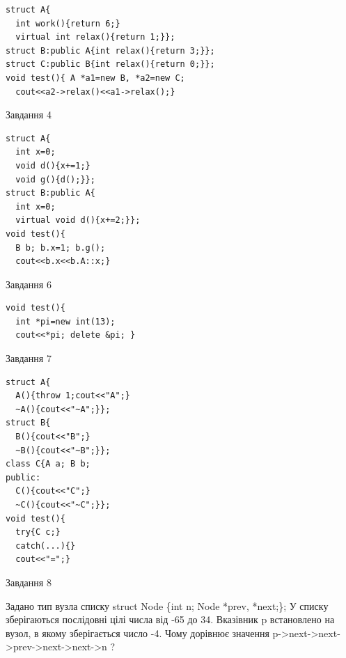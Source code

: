\documentclass[12pt, ukrainian]{article}
\begin{document}
{{{{{{\begin{minipage}[t]{11cm}
\begin{verbatim}
struct A{
  int work(){return 6;}
  virtual int relax(){return 1;}};
struct B:public A{int relax(){return 3;}};
struct C:public B{int relax(){return 0;}};
void test(){ A *a1=new B, *a2=new C;
  cout<<a2->relax()<<a1->relax();}
\end{verbatim}            


\end{minipage}
\vline \hspace{8mm}
\begin{minipage}[t]{7cm}
               
{\begin{center}Завдання {4}\end{center}}
\vspace{-6mm}

\begin{verbatim}
struct A{
  int x=0;
  void d(){x+=1;}
  void g(){d();}};
struct B:public A{
  int x=0;
  virtual void d(){x+=2;}};
void test(){
  B b; b.x=1; b.g();
  cout<<b.x<<b.A::x;}
\end{verbatim}            


               
{\begin{center}Завдання {6}\end{center}}
\vspace{-6mm}

\begin{verbatim}
void test(){
  int *pi=new int(13);
  cout<<*pi; delete &pi; }
\end{verbatim}            


               
{\begin{center}Завдання {7}\end{center}}
\vspace{-6mm}

\begin{verbatim}
struct A{
  A(){throw 1;cout<<"A";}
  ~A(){cout<<"~A";}};
struct B{
  B(){cout<<"B";}
  ~B(){cout<<"~B";}};
class C{A a; B b;
public:
  C(){cout<<"C";}
  ~C(){cout<<"~C";}};
void test(){
  try{C c;} 
  catch(...){} 
  cout<<"=";}
\end{verbatim}            


\end{minipage}
               
{\begin{center}Завдання {8}\end{center}}
\vspace{-6mm}
Задано тип вузла списку
struct Node \{int n; Node *prev, *next;\};
У списку зберігаються послідовні цілі числа від -65 до 34. Вказівник p встановлено на вузол, в якому зберігається число -4.
Чому дорівнює значення p->next->next->prev->next->next->n ?\par

}}}}}}
\end{document}

